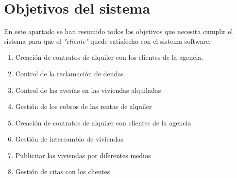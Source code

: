\chapter{Objetivos del sistema} \label{Objetivos}
En este apartado se han resumido todos los objetivos que necesita cumplir el sistema para que el \textit{"cliente"} quede satisfecho con el sistema software.

\begin{enumerate}
\item Creación de contratos de alquiler con los clientes de la agencia.

\item Control de la reclamación de deudas

\item Control de las averías en las viviendas alquiladas

\item Gestión de los cobros de las rentas de alquiler

\item Creación de contratos de alquiler con clientes de la agencia

\item Gestión de intercambio de viviendas

\item Publicitar las viviendas por diferentes medios

\item Gestión de citas con los clientes
\end{enumerate}